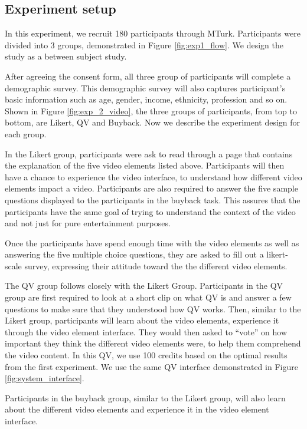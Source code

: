 \subsection{Experiment setup}
In this experiment,
we recruit 180 participants through MTurk.
Participants were divided into 3 groups, 
demonstrated in Figure \ref{fig:exp1_flow}.
We design the study as a between subject study.

After agreeing the consent form,
all three group of participants 
will complete a demographic survey.
This demographic survey will also
captures participant's basic information 
such as age, gender, income, ethnicity, profession and so on. 
Shown in Figure \ref{fig:exp_2_video}, 
the three groups of participants,
from top to bottom, are Likert, QV and Buyback.
Now we describe the experiment design for each group.

In the Likert group,
participants were ask to read through a page
that contains the explanation of the five video elements
listed above.
Participants will then have a chance to experience
the video interface,
to understand how different video elements
impact a video.
Participants are also required to answer the five sample questions
displayed to the participants in the buyback task.
This assures that the participants have the same goal of 
trying to understand the context of the video
and not just for pure entertainment purposes.

Once the participants have spend enough time with the video elements
as well as answering the five multiple choice questions,
they are asked to fill out a likert-scale survey,
expressing their attitude
toward the the different video elements.

The QV group follows closely with the Likert Group.
Participants in the QV group 
are first required to look at a short clip
on what QV is and answer a few questions
to make sure that they understood how QV works.
Then, similar to the Likert group, 
participants will learn about the video elements, 
experience it through the video element interface.
They would then asked to ``vote'' on how important they think
the different video elements were,
to help them comprehend the video content.
In this QV, we use 100 credits based on the optimal
results from the first experiment.
We use the same QV interface demonstrated in Figure \ref{fig:system_interface}.

Participants in the buyback group,
similar to the Likert group,
will also learn about the different video elements
and experience it in the video element interface.

